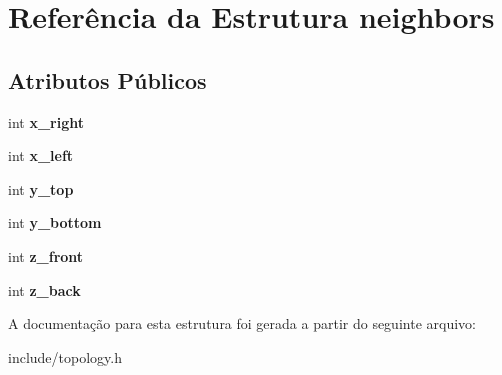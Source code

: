 \hypertarget{structneighbors}{
\section{Referência da Estrutura neighbors}
\label{structneighbors}
}
\subsection*{Atributos Públicos}
\begin{DoxyCompactItemize}
\item 
\hypertarget{structneighbors_a26d54570fbba53688495824014768f28}{
int {\bfseries x\_\-right}}
\label{structneighbors_a26d54570fbba53688495824014768f28}

\item 
\hypertarget{structneighbors_a5457fe55ef1d552dbc26c8d0905e7aa2}{
int {\bfseries x\_\-left}}
\label{structneighbors_a5457fe55ef1d552dbc26c8d0905e7aa2}

\item 
\hypertarget{structneighbors_abbbcf78d71c28164994ac0581046254f}{
int {\bfseries y\_\-top}}
\label{structneighbors_abbbcf78d71c28164994ac0581046254f}

\item 
\hypertarget{structneighbors_a9f7a971694ebd81d2004c3acad41c647}{
int {\bfseries y\_\-bottom}}
\label{structneighbors_a9f7a971694ebd81d2004c3acad41c647}

\item 
\hypertarget{structneighbors_abdbb2d32f2f3e02ad4cfcc88075c9a84}{
int {\bfseries z\_\-front}}
\label{structneighbors_abdbb2d32f2f3e02ad4cfcc88075c9a84}

\item 
\hypertarget{structneighbors_a970c504becaec8c939602bf87da8f0ac}{
int {\bfseries z\_\-back}}
\label{structneighbors_a970c504becaec8c939602bf87da8f0ac}

\end{DoxyCompactItemize}


A documentação para esta estrutura foi gerada a partir do seguinte arquivo:\begin{DoxyCompactItemize}
\item 
include/topology.h\end{DoxyCompactItemize}
